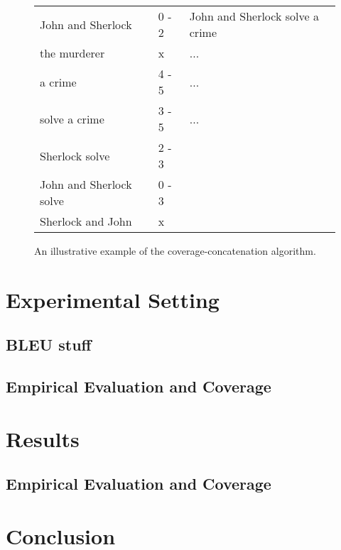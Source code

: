 \documentclass[11pt]{article}
\begin{document}
\begin{figure}
    \begin{tabular}{l|l|l}
    John and Sherlock       & 0 - 2 & John and Sherlock solve a crime \\
    the murderer            & x     & ...                             \\
    a crime                 & 4 - 5 & ...                             \\
    solve a crime           & 3 - 5 & ...                             \\
    Sherlock solve          & 2 - 3 & ~                               \\
    John and Sherlock solve & 0 - 3 & ~                               \\
    Sherlock and John       & x     & ~                               \\
    \end{tabular}
\caption{An illustrative example of the coverage-concatenation algorithm.}
    \label{algorithm}
\end{figure}

\section{Experimental Setting}

\subsection{BLEU stuff}

\subsection{Empirical Evaluation and Coverage}
\label{eval}

\section{Results}

\subsection{Empirical Evaluation and Coverage}

\section{Conclusion}


\end{document}
